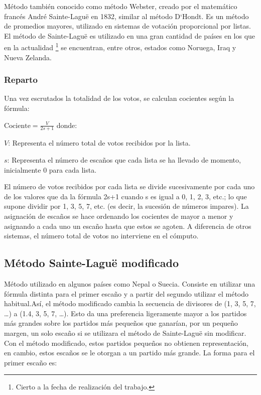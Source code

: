 \documentclass[12pt,a4paper,]{book}
\let\rmarkdownfootnote\footnote%
\def\footnote{\protect\rmarkdownfootnote}
\numberwithin{dummy}{section}
\theoremstyle{ocrenumbox}
\theoremstyle{blacknumex}
\theoremstyle{blacknumbox}
\theoremstyle{ocrenum}
\theoremstyle{ocrenum}
\begin{document}
Método también conocido como método Webster, creado por el matemático
francés André Sainte-Laguë en 1832, similar al método D`Hondt. Es un
método de promedios mayores, utilizado en sistemas de votación
proporcional por listas.\\
El método de Sainte-Laguë es utilizado en una gran cantidad de países en
los que en la actualidad \footnote{Cierto a la fecha de realización del
  trabajo.} se encuentran, entre otros, estados como Noruega, Iraq y
Nueva Zelanda.

\hypertarget{reparto-1}{%
\subsubsection{Reparto}\label{reparto-1}}

Una vez escrutados la totalidad de los votos, se calculan cocientes
según la fórmula:

\(\textrm{Cociente} = \frac{V}{2s+1}\) donde:

\(V\): Representa el número total de votos recibidos por la lista.

\(s\): Representa el número de escaños que cada lista se ha llevado de
momento, inicialmente 0 para cada lista.

El número de votos recibidos por cada lista se divide sucesivamente por
cada uno de los valores que da la fórmula 2s+1 cuando s es igual a 0, 1,
2, 3, etc.; lo que supone dividir por 1, 3, 5, 7, etc. (es decir, la
sucesión de números impares). La asignación de escaños se hace ordenando
los cocientes de mayor a menor y asignando a cada uno un escaño hasta
que estos se agoten. A diferencia de otros sistemas, el número total de
votos no interviene en el cómputo.

\hypertarget{muxe9todo-sainte-laguuxeb-modificado}{%
\subsection{Método Sainte-Laguë
modificado}\label{muxe9todo-sainte-laguuxeb-modificado}}

Método utilizado en algunos países como Nepal o Suecia. Consiste en
utilizar una fórmula distinta para el primer escaño y a partir del
segundo utilizar el método habitual.Así, el método modificado cambia la
secuencia de divisores de (1, 3, 5, 7, \ldots) a (1.4, 3, 5, 7, \ldots).
Esto da una preferencia ligeramente mayor a los partidos más grandes
sobre los partidos más pequeños que ganarían, por un pequeño margen, un
solo escaño si se utilizara el método de Sainte-Laguë sin modificar. Con
el método modificado, estos partidos pequeños no obtienen
representación, en cambio, estos escaños se le otorgan a un partido más
grande. La forma para el primer escaño es:
\end{document}
